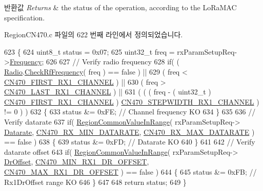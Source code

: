 \begin{DoxyRetVals}{반환값}
{\em Returns} & the status of the operation, according to the Lo\+Ra\+M\+AC specification. \\
\hline
\end{DoxyRetVals}


Region\+C\+N470.\+c 파일의 622 번째 라인에서 정의되었습니다.


\begin{DoxyCode}
623 \{
624     uint8\_t status = 0x07;
625     uint32\_t freq = rxParamSetupReq->\mbox{\hyperlink{structs_rx_param_setup_req_params_ade3d190636488dad9a89b19446b7acf1}{Frequency}};
626 
627     \textcolor{comment}{// Verify radio frequency}
628     \textcolor{keywordflow}{if}( ( \mbox{\hyperlink{sx1276mb1las_8c_acf9fe61a72c16fa29a0dc449d23e3820}{Radio}}.\mbox{\hyperlink{struct_radio__s_a984f224d5ef26fb8a35f77d664f384df}{CheckRfFrequency}}( freq ) == false ) ||
629         ( freq < \mbox{\hyperlink{group___r_e_g_i_o_n_c_n470_gaffb4e82c12bc61e97f83d18fb4187aa8}{CN470\_FIRST\_RX1\_CHANNEL}} ) ||
630         ( freq > \mbox{\hyperlink{group___r_e_g_i_o_n_c_n470_ga5a6508f01066a5bde9c059367babd9cb}{CN470\_LAST\_RX1\_CHANNEL}} ) ||
631         ( ( ( freq - ( uint32\_t ) \mbox{\hyperlink{group___r_e_g_i_o_n_c_n470_gaffb4e82c12bc61e97f83d18fb4187aa8}{CN470\_FIRST\_RX1\_CHANNEL}} ) %
      \mbox{\hyperlink{group___r_e_g_i_o_n_c_n470_ga7786b9dddae0675b2d8cc26b0d230756}{CN470\_STEPWIDTH\_RX1\_CHANNEL}} ) != 0 ) )
632     \{
633         status &= 0xFE; \textcolor{comment}{// Channel frequency KO}
634     \}
635 
636     \textcolor{comment}{// Verify datarate}
637     \textcolor{keywordflow}{if}( \mbox{\hyperlink{group___r_e_g_i_o_n_c_o_m_m_o_n_gafdd1c80d953e18d755a631b72a9c3bd3}{RegionCommonValueInRange}}( rxParamSetupReq->
      \mbox{\hyperlink{structs_rx_param_setup_req_params_ae2f6080f3aa0e9485c55513ca56bb24d}{Datarate}}, \mbox{\hyperlink{group___r_e_g_i_o_n_c_n470_ga5aa969a4651406bcd74903035a8cfc4f}{CN470\_RX\_MIN\_DATARATE}}, 
      \mbox{\hyperlink{group___r_e_g_i_o_n_c_n470_ga32c6368247a51d46cc53dfe9ea8c1d39}{CN470\_RX\_MAX\_DATARATE}} ) == false )
638     \{
639         status &= 0xFD; \textcolor{comment}{// Datarate KO}
640     \}
641 
642     \textcolor{comment}{// Verify datarate offset}
643     \textcolor{keywordflow}{if}( \mbox{\hyperlink{group___r_e_g_i_o_n_c_o_m_m_o_n_gafdd1c80d953e18d755a631b72a9c3bd3}{RegionCommonValueInRange}}( rxParamSetupReq->
      \mbox{\hyperlink{structs_rx_param_setup_req_params_ad920e18a48423b1eb1fe40d1b2b082d4}{DrOffset}}, \mbox{\hyperlink{group___r_e_g_i_o_n_c_n470_gabba9bdb3ecb54ce42aeaf14c3bc639f4}{CN470\_MIN\_RX1\_DR\_OFFSET}}, 
      \mbox{\hyperlink{group___r_e_g_i_o_n_c_n470_ga2d30070788e36cbb178f0fb025f23a91}{CN470\_MAX\_RX1\_DR\_OFFSET}} ) == false )
644     \{
645         status &= 0xFB; \textcolor{comment}{// Rx1DrOffset range KO}
646     \}
647 
648     \textcolor{keywordflow}{return} status;
649 \}
\end{DoxyCode}
